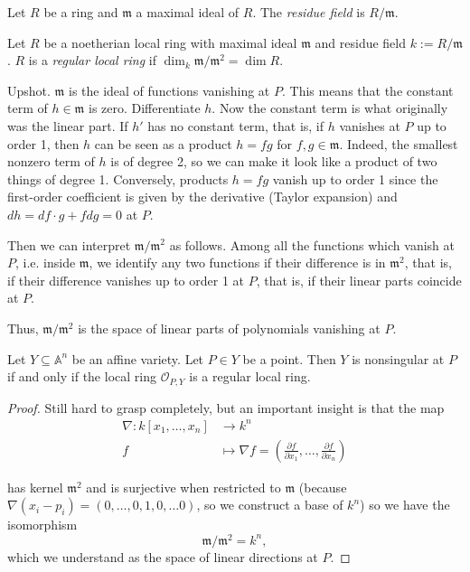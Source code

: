 \begin{definition}
\label{definition-residue-field}
Let $R$ be a ring and $\mathfrak{m}$ a maximal ideal of $R$.
The {\it residue field} is  $R/\mathfrak{m}$.
\end{definition}

\begin{definition}
\label{definition-regular-local-ring}
Let $R$ be a noetherian local ring with maximal ideal $\mathfrak{m}$
and residue field $k:=R/\mathfrak{m}$.
$R$ is a {\it regular local ring} if
$\dim_k \mathfrak{m}/\mathfrak{m}^2=\dim R$.
\end{definition}

\noindent
Upshot. $\mathfrak{m}$ is the ideal of functions vanishing at $P$.
This means that the constant term of $h \in \mathfrak{m}$ is zero.
Differentiate $h$.
Now the constant term is what originally was the linear part.
If $h'$ has no constant term, that is, if $h$ vanishes at $P$
up to order 1,
then $h$ can be seen as a product $h=fg$ for $f,g \in \mathfrak{m}$.
Indeed, the smallest nonzero term of $h$ is of degree 2,
so we can make it look like a product of two things of degree 1.
Conversely, products $h=fg$ vanish up to order 1 since
the first-order coefficient is given by the derivative
(Taylor expansion)
and $dh=df\cdot g+fdg =0$ at $P$.

Then we can interpret $\mathfrak{m}/\mathfrak{m}^2$ as follows.
Among all the functions which vanish at $P$, i.e. inside $\mathfrak{m}$,
we identify any two functions if their difference
is in $\mathfrak{m}^2$,
that is, if their difference vanishes up to order 1 at $P$,
that is, if their linear parts coincide at $P$.

Thus, $\mathfrak{m}/\mathfrak{m}^2$ is the space
of linear parts of polynomials vanishing at $P$.

\begin{theorem}
\label{theorem-nonsingularity-jacobian-iff-regular-local-ring}
Let $Y \subseteq \mathbb{A}^n$ be an affine variety.
Let $P \in Y$ be a point.
Then $Y$ is nonsingular at $P$ 
if and only if
the local ring $\mathcal{O}_{P,Y}$ is a regular local ring.
\end{theorem}

\begin{proof}
Still hard to grasp completely,
but an important insight is that the map
\begin{align*}
\nabla: k[x_1,…,x_n]  &\longrightarrow k^n \\
 f &\longmapsto \nabla f=\left(\frac{\partial f}{\partial x_1},
…,\frac{\partial f}{\partial x_n}\right) 
\end{align*}

\noindent
has kernel $\mathfrak{m}^2$ and is surjective
when restricted to $\mathfrak{m}$
(because $\nabla(x_i-p_i)=(0,…,0,1,0,…0)$, so we construct a base of $k^n$)
so we have the isomorphism
$$
\mathfrak{m}/\mathfrak{m}^2=k^n,
$$
which we understand as the space of linear directions at $P$.
\end{proof}

